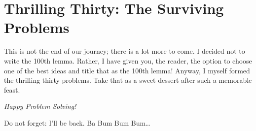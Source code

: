 \documentclass[11pt,a4paper]{article}
\begin{document}
\section*{Thrilling Thirty: The Surviving Problems}
This is not the end of our journey; there is a lot more to come.
I decided not to write the 100th lemma. Rather, I have given you, the reader,
the option to choose one of the best ideas and title that as the 100th lemma!
Anyway, I myself formed the thrilling thirty problems. Take that as a sweet dessert
after such a memorable feast.

\emph{Happy Problem Solving!}

Do not forget: I'll be back. Ba Bum Bum Bum\ldots
\end{document}
